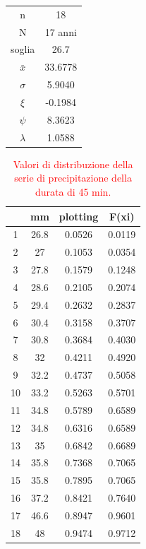 \begin{table}[H]
\begin{minipage}{.5\linewidth}
\begin{tabular}{cc}
            \toprule
            n        &    18     \\
            N        & 17 anni \\
            soglia   &      26.7   \\
            $\bar{x}$ &    33.6778    \\
            $\sigma$ &     5.9040    \\
            $\xi$      &   -0.1984    \\
            $\psi$      &   8.3623  \\
            $\lambda$   &  1.0588  \\
        \bottomrule     
        \end{tabular}
    \end{minipage} 
\end{table}

\begin{table}[H] \centering
    \caption{\textcolor{red}{Valori di distribuzione della serie di precipitazione della durata di 45 min.}}
            \begin{tabular}{cccc}
            \toprule
               & mm   & plotting & F(xi)  \\
            \midrule
            1  & 26.8 & 0.0526   & 0.0119 \\
            2  & 27   & 0.1053   & 0.0354 \\
            3  & 27.8 & 0.1579   & 0.1248 \\
            4  & 28.6 & 0.2105   & 0.2074 \\
            5  & 29.4 & 0.2632   & 0.2837 \\
            6  & 30.4 & 0.3158   & 0.3707 \\
            7  & 30.8 & 0.3684   & 0.4030 \\
            8  & 32   & 0.4211   & 0.4920 \\
            9  & 32.2 & 0.4737   & 0.5058 \\
            10 & 33.2 & 0.5263   & 0.5701 \\
            11 & 34.8 & 0.5789   & 0.6589 \\
            12 & 34.8 & 0.6316   & 0.6589 \\
            13 & 35   & 0.6842   & 0.6689 \\
            14 & 35.8 & 0.7368   & 0.7065 \\
            15 & 35.8 & 0.7895   & 0.7065 \\
            16 & 37.2 & 0.8421   & 0.7640 \\
            17 & 46.6 & 0.8947   & 0.9601 \\
            18 & 48   & 0.9474   & 0.9712 \\
            \bottomrule
            \end{tabular}
\end{table}

